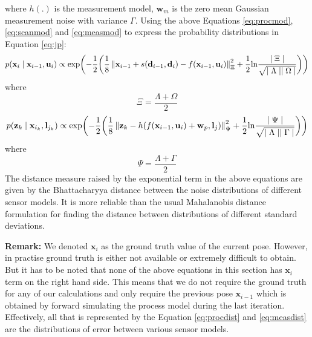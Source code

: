 where $h(.)$ is the measurement model, $\textbf{w}_m$ is the zero mean Gaussian measurement noise with variance $\Gamma$. Using the above Equations \ref{eq:procmod}, \ref{eq:scanmod} and \ref{eq:measmod} to express the probability distributions in Equation \ref{eq:jp}:
\begin{equation}
p(\textbf{x}_i \mid \textbf{x}_{i-1}, \textbf{u}_i)  \propto \text{exp} \biggl(-\frac{1}{2} \biggl( \frac{1}{8}\left\lVert\textbf{x}_{i-1} + s(\textbf{d}_{i-1}, \textbf{d}_i) - f(\textbf{x}_{i-1},\textbf{u}_i)\right\rVert_{\Xi}^2 + \frac{1}{2} \text{ln} \frac{\mid \Xi \mid}{\sqrt{\mid \Lambda \mid \mid \Omega \mid}}\biggr)\biggr)
\label{eq:procdist}
\end{equation}
where
$$\Xi = \frac{\Lambda+\Omega}{2}$$
\begin{equation}
p(\textbf{z}_k\mid \textbf{x}_{i_k}, \textbf{l}_{j_k}) \propto \text{exp} \biggl(-\frac{1}{2} \biggl( \frac{1}{8}\left\lVert\textbf{z}_{k} - h(f(\textbf{x}_{i-1}, \textbf{u}_i) + \textbf{w}_p, \textbf{l}_j)\right\rVert_{\Psi}^2 + \frac{1}{2} \text{ln} \frac{\mid \Psi \mid}{\sqrt{\mid \Lambda \mid \mid \Gamma \mid}}\biggr)\biggr)
\label{eq:measdist}
\end{equation}
where
$$\Psi = \frac{\Lambda+\Gamma}{2} $$
The distance measure raised by the exponential term in the above equations are given by the Bhattacharyya distance \cite{Bhattacharyya} between the noise distributions of different sensor models. It is more reliable than the usual Mahalanobis distance formulation for finding the distance between distributions of different standard deviations. 

\textbf{Remark:} We denoted $\textbf{x}_{i}$ as the ground truth value of the current pose. However, in practise ground truth is either not available or extremely difficult to obtain. But it has to be noted that none of the above equations in this section has $\textbf{x}_i$ term on the right hand side. This means that we do not require the ground truth for any of our calculations and only require the previous pose $\textbf{x}_{i-1}$ which is obtained by forward simulating the process model during the last iteration. Effectively, all that is represented by the Equation \ref{eq:procdist} and \ref{eq:measdist} are the distributions of error between various sensor models.

